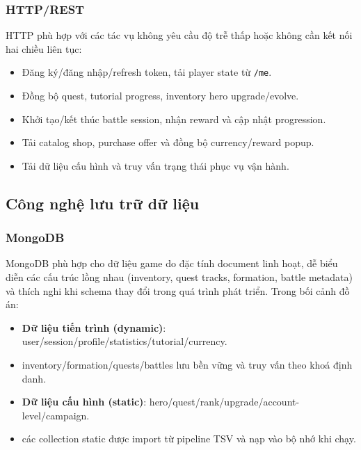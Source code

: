 \subsubsection{HTTP/\allowbreak REST}

HTTP phù hợp với các tác vụ không yêu cầu độ trễ thấp hoặc không cần kết nối hai chiều liên tục:
\begin{itemize}
    \item Đăng ký/\allowbreak đăng nhập/\allowbreak refresh token, tải player state từ \texttt{/me}.
    \item Đồng bộ quest, tutorial progress, inventory hero upgrade/\allowbreak evolve.
    \item Khởi tạo/\allowbreak kết thúc battle session, nhận reward và cập nhật progression.
    \item Tải catalog shop, purchase offer và đồng bộ currency/\allowbreak reward popup.
    \item Tải dữ liệu cấu hình và truy vấn trạng thái phục vụ vận hành\cite{nest-docs}.
\end{itemize}

\subsection{Công nghệ lưu trữ dữ liệu}

\subsubsection{MongoDB}

MongoDB phù hợp cho dữ liệu game do đặc tính document linh hoạt, dễ biểu diễn các cấu trúc lồng nhau (inventory, quest tracks, formation, battle metadata) và thích nghi khi schema thay đổi trong quá trình phát triển\cite{mongodb-guide}. Trong bối cảnh đồ án:
\begin{itemize}
    \item \textbf{Dữ liệu tiến trình (dynamic)}:
    user/\allowbreak session/\allowbreak profile/\allowbreak statistics/\allowbreak tutorial/\allowbreak currency.
    \item inventory/\allowbreak formation/\allowbreak quests/\allowbreak battles lưu bền vững và truy vấn theo khoá định danh.
    \item \textbf{Dữ liệu cấu hình (static)}:
    hero/\allowbreak quest/\allowbreak rank/\allowbreak upgrade/\allowbreak account-level/\allowbreak campaign.
    \item các collection static được import từ pipeline TSV và nạp vào bộ nhớ khi chạy.
\end{itemize}

